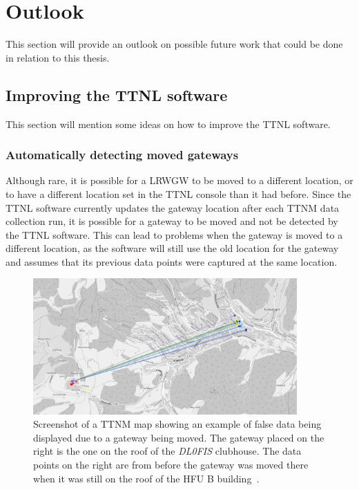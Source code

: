 \section{Outlook}

This section will provide an outlook on possible future work that could be done in relation to this thesis.

\subsection{Improving the \acl{TTNL} software}

This section will mention some ideas on how to improve the \ac{TTNL} software.

\subsubsection{Automatically detecting moved gateways}

Although rare, it is possible for a \acl{LRWGW} to be moved to a different location, or to have a different location set in the \ac{TTNL} console than it had before.
Since the \ac{TTNL} software currently updates the gateway location after each \ac{TTNM} data collection run, it is possible for a gateway to be moved and not be detected by the \ac{TTNL} software.
This can lead to problems when the gateway is moved to a different location, as the software will still use the old location for the gateway and assumes that its previous data points were captured at the same location.

\begin{figure}[htbp]
    \centering
    \includegraphics[width=0.9\textwidth]{pictures/ttn-mapper/moved_gateway_example.png}
    \caption{
        Screenshot of a \ac{TTNM} map showing an example of false data being displayed due to a gateway being moved.
        The gateway placed on the right is the one on the roof of the \emph{DL0FIS} clubhouse.
        The data points on the right are from before the gateway was moved there when it was still on the roof of the \ac{HFU} B building~\cite{ttn_mapper_ttn_2023}.
    }\label{pic:gateway-moved-example}
\end{figure}

